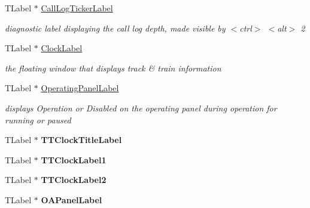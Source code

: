 \begin{DoxyCompactItemize}
\mbox{\label{class_t_interface_a6c42fa668ecb3a9e4f8ddeb677781b84}} 
T\+Label $\ast$ \mbox{\hyperlink{class_t_interface_a6c42fa668ecb3a9e4f8ddeb677781b84}{Call\+Log\+Ticker\+Label}}
\begin{DoxyCompactList}\small\item\em diagnostic label displaying the call log depth, made visible by $<$ctrl$>$ $<$alt$>$ \textquotesingle{}2\textquotesingle{} \end{DoxyCompactList}\item 
\mbox{\label{class_t_interface_af06ebc1f5417120c44b3474e2eb1ea51}} 
T\+Label $\ast$ \mbox{\hyperlink{class_t_interface_af06ebc1f5417120c44b3474e2eb1ea51}{Clock\+Label}}
\begin{DoxyCompactList}\small\item\em the floating window that displays track \& train information \end{DoxyCompactList}\item 
\mbox{\label{class_t_interface_a167b9a4eba88ea3020f67a1c89907838}} 
T\+Label $\ast$ \mbox{\hyperlink{class_t_interface_a167b9a4eba88ea3020f67a1c89907838}{Operating\+Panel\+Label}}
\begin{DoxyCompactList}\small\item\em displays \textquotesingle{}Operation\textquotesingle{} or \textquotesingle{}Disabled\textquotesingle{} on the operating panel during operation for running or paused \end{DoxyCompactList}\item 
\mbox{\label{class_t_interface_a2d641fff539cab58c2a833cf3ed63e72}} 
T\+Label $\ast$ {\bfseries T\+T\+Clock\+Title\+Label}
\item 
\mbox{\label{class_t_interface_a19f0b0173b71d400eed6de0b32cf52c6}} 
T\+Label $\ast$ {\bfseries T\+T\+Clock\+Label1}
\item 
\mbox{\label{class_t_interface_a4ea88dbbf3539f837e0e6eefcc127214}} 
T\+Label $\ast$ {\bfseries T\+T\+Clock\+Label2}
\item 
\mbox{\label{class_t_interface_ac09986496b415b12787f5896be321ebe}} 
T\+Label $\ast$ {\bfseries O\+A\+Panel\+Label}

\end{DoxyCompactItemize}
